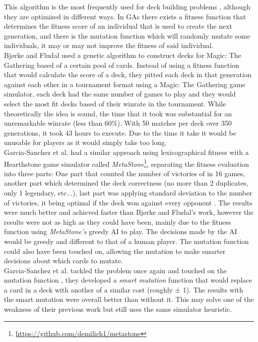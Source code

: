 \documentclass{report}
\begin{document}
This algorithm is the most frequently used for deck building problems \cite{Fludal2017}\cite{GarciaSanchez2016}\cite{GarciaSanchez2018}, although they are optimized in different ways. In GAs there exists a fitness function that determines the fitness score of an individual that is used to create the next generation, and there is the mutation function which will randomly mutate some individuals, it may or may not improve the fitness of said individual. \\ 
\indent Bjørke and Fludal \cite{Fludal2017} used a genetic algorithm to construct decks for Magic: The Gathering based of a certain pool of cards. Instead of using a fitness function that would calculate the score of a deck, they pitted each deck in that generation against each other in a tournament format using a Magic: The Gathering game simulator, each deck had the same number of games to play and they would select the most fit decks based of their winrate in the tournament. While theoretically the idea is sound, the time that it took was substantial for an unremarkable winrate (less than 60\%). With 50 matches per deck over 350 generations, it took 43 hours to execute. Due to the time it take it would be unusable for players as it would simply take too long.\\
\indent Garcia-Sanchez et al. had a similar approach using lexicographical fitness with a Hearthstone game simulator called \textit{MetaStone}\footnote{\url{https://github.com/demilich1/metastone}}, separating the fitness evaluation into three parts: One part that counted the number of victories of in 16 games, another part which determined the deck correctness (no more than 2 duplicates, only 1 legendary, etc...), last part was applying standard deviation to the number of victories, it being optimal if the deck won against every opponent \cite{GarciaSanchez2016}. The results were much better and achieved faster than Bjørke and Fludal's work\cite{Fludal2017}, however the results were not as high as they could have been, mainly due to the fitness function using \textit{MetaStone's} greedy AI to play. The decisions made by the AI would be greedy and different to that of a human player. The mutation function could also have been touched on, allowing the mutation to make smarter decisions about which cards to mutate. \\
\indent Garcia-Sanchez et al. tackled the problem once again and touched on the mutation function \cite{GarciaSanchez2018}, they developed a \textit{smart mutation} function that would replace a card in a deck with another of a similar cost (roughly ± 1). The results with the smart mutation were overall better than without it. This may solve one of the weakness of their previous work\cite{GarciaSanchez2016} but still uses the same simulator heuristic.
\end{document}
